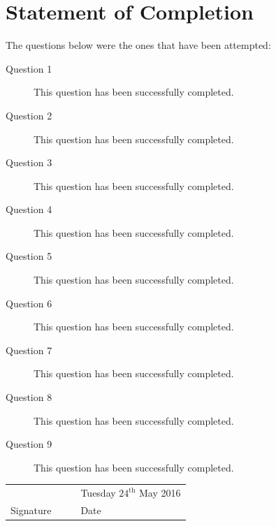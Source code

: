 \documentclass[12pt,a4paper,onesided]{report}
\begin{document}
\chapter*{Statement of Completion}
The questions below were the ones that have been attempted:
	\begin{description}
		\item[Question 1]This question has been successfully completed.
		\item[Question 2]This question has been successfully completed.
		\item[Question 3]This question has been successfully completed.
		\item[Question 4]This question has been successfully completed.
		\item[Question 5]This question has been successfully completed.
		\item[Question 6]This question has been successfully completed.
		\item[Question 7]This question has been successfully completed.
		\item[Question 8]This question has been successfully completed.
		\item[Question 9]This question has been successfully completed.
	\end{description}

\vspace{5em}
\begin{table}[h]
	\centering
\begin{tabular}{lp{20ex}p{20ex}lp{20ex}}
	 & & & \multicolumn{2}{l}{Tuesday $24^{\text{th}}$ May 2016} \\\cline{1-2} \cline{4-5}
	 Signature & & & Date &\\
\end{tabular}
\end{table}
\end{document}
